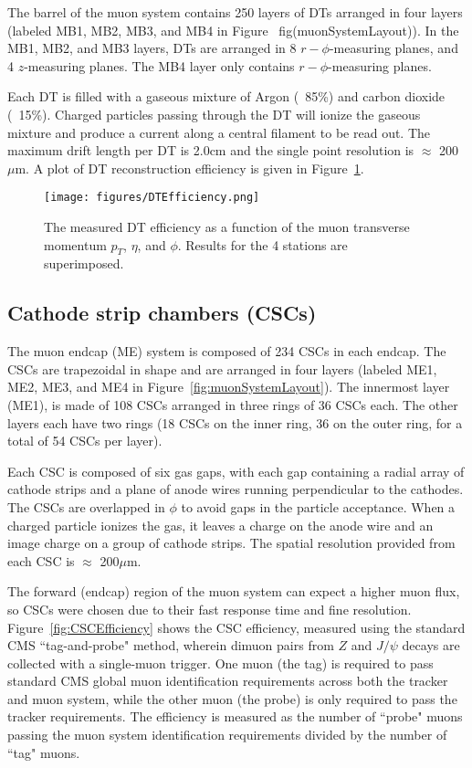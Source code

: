 The barrel of the muon system contains 250 layers of DTs arranged in four layers (labeled MB1, MB2, MB3, and MB4 in Figure ~fig(muonSystemLayout)). In the MB1, MB2, and MB3 layers, DTs are arranged in 8 $r-\phi$-measuring planes, and 4 $z$-measuring planes. The MB4 layer only contains $r-\phi$-measuring planes.

Each DT is filled with a gaseous mixture of Argon (~85\%) and carbon dioxide (~15\%). Charged particles passing through the DT will ionize the gaseous mixture and produce a current along a central filament to be read out. The maximum drift length per DT is 2.0cm and the single point resolution is $\approx$ 200 $\mu$m. A plot of DT reconstruction efficiency is given in Figure~\ref{fig:DTEfficiency}. %

\begin{figure}\centering
  \texttt{[image: figures/DTEfficiency.png]}
  \caption{\label{fig:DTEfficiency} The measured DT efficiency as a function of the muon transverse momentum $p_T$,
$\eta$, and $\phi$. Results for the 4 stations are superimposed.}
\end{figure}

\subsection{Cathode strip chambers (CSCs)}

The muon endcap (ME) system is composed of 234 CSCs in each endcap. The CSCs are trapezoidal in shape and are arranged in four layers  (labeled ME1, ME2, ME3, and ME4 in Figure~\ref{fig:muonSystemLayout}). The innermost layer (ME1), is made of 108 CSCs arranged in three rings of 36 CSCs each. The other layers each have two rings (18 CSCs on the inner ring, 36 on the outer ring, for a total of 54 CSCs per layer).

Each CSC is composed of six gas gaps, with each gap containing a radial array of cathode strips and a plane of anode wires running perpendicular to the cathodes. The CSCs are overlapped in $\phi$ to avoid gaps in the particle acceptance. When a charged particle ionizes the gas, it leaves a charge on the anode wire and an image charge on a group of cathode strips. The spatial resolution provided from each CSC is $\approx$ 200$\mu$m.

The forward (endcap) region of the muon system can expect a higher muon flux, so CSCs were chosen due to their fast response time and fine resolution. Figure~\ref{fig:CSCEfficiency} shows the CSC efficiency, measured using the standard CMS ``tag-and-probe" method, wherein dimuon pairs from $Z$ and $J/\psi$ decays are collected with a single-muon trigger. One muon (the tag) is required to pass standard CMS global muon identification requirements across both the tracker and muon system, while the other muon (the probe) is only required to pass the tracker requirements. The efficiency is measured as the number of ``probe" muons passing the muon system identification requirements divided by the number of ``tag" muons. %

